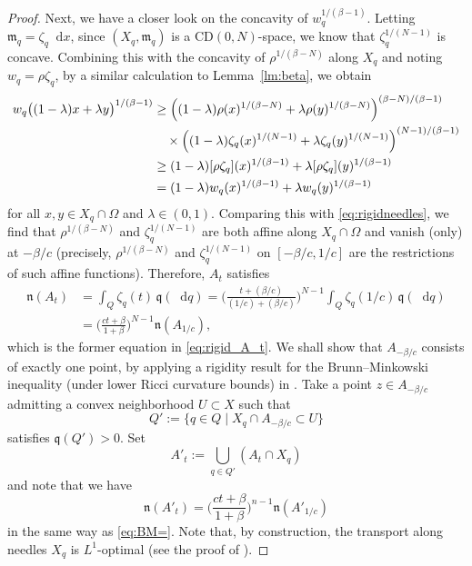 \documentclass[sts]{imsart}
\theoremstyle{definition}
\theoremstyle{remark}
\newcommand{\fm}{\mathfrak{m}}
\newcommand{\fn}{\mathfrak{n}}
\newcommand{\fq}{\mathfrak{q}}
\newcommand{\CD}{\mathrm{CD}}
\newcommand*\diff{\mathop{}\!\mathrm{d}}
\begin{document}
\begin{proof}
Next, we have a closer look on the concavity of $w_q^{1/(\beta-1)}$.
Letting $\fm_q =\zeta_q \diff x$, since $(X_q,\fm_q)$ is a $\CD(0,N)$-space, we know that $\zeta_q^{1/(N-1)}$ is concave.
Combining this with the concavity of $\rho^{1/(\beta -N)}$ along $X_q$ and noting $w_q=\rho \zeta_q$, by a similar calculation to Lemma~\ref{lm:beta}, we obtain
\begin{align*}
w_q \bigl( (1-\lambda)x +\lambda y \bigr)^{1/(\beta -1)}
&\ge \Bigl( (1-\lambda)\rho(x)^{1/(\beta -N)}
 +\lambda \rho(y)^{1/(\beta -N)} \Bigr)^{(\beta -N)/(\beta -1)} \\
&\quad \times \Bigl( (1-\lambda)\zeta_q(x)^{1/(N-1)}
 +\lambda \zeta_q(y)^{1/(N-1)} \Bigr)^{(N-1)/(\beta -1)} \\
&\ge (1-\lambda)[\rho\zeta_q](x)^{1/(\beta -1)}
 +\lambda [\rho\zeta_q](y)^{1/(\beta -1)} \\
&= (1-\lambda) w_q(x)^{1/(\beta -1)} +\lambda w_q(y)^{1/(\beta -1)}
\end{align*}
for all $x,y \in X_q \cap \Omega$ and $\lambda \in (0,1)$.
Comparing this with \eqref{eq:rigidneedles},
we find that $\rho^{1/(\beta -N)}$ and $\zeta_q^{1/(N-1)}$ are both affine along $X_q \cap \Omega$ and vanish (only) at $-\beta/c$
(precisely, $\rho^{1/(\beta -N)}$ and $\zeta_q^{1/(N-1)}$ on $[-\beta/c,1/c]$ are the restrictions of such affine functions).
Therefore, $A_t$ satisfies
\begin{equation*}%
\begin{split}
\fn(A_t) &= \int_Q \zeta_q(t) \,\fq(\diff q)
 =\biggl( \frac{t+(\beta/c)}{(1/c)+(\beta/c)} \biggr)^{N-1}
 \int_Q \zeta_q(1/c) \,\fq(\diff q) \\
&= \biggl( \frac{ct+\beta}{1+\beta} \biggr)^{N-1} \fn(A_{1/c}),
\end{split}
\end{equation*}
which is the former equation in \eqref{eq:rigid_A_t}.
%
We shall show that $A_{-\beta/c}$ consists of exactly one point,
by applying a rigidity result for the Brunn--Minkowski inequality (under lower Ricci curvature bounds) in \cite{BK}.
Take a point $z \in A_{-\beta/c}$ admitting a convex neighborhood $U \subset X$ such that
\[
Q' :=\{ q \in Q \mid X_q \cap A_{-\beta/c} \subset U \}
\]
satisfies $\fq(Q')>0$.
Set
\[
A'_t := \bigcup_{q \in Q'} (A_t \cap X_q)
\]
and note that we have
\[
\fn(A'_t) =\biggl( \frac{ct+\beta}{1+\beta} \biggr)^{n-1} \fn(A'_{1/c})
\]
in the same way as \eqref{eq:BM=}.
%
Note that, by construction, the transport along needles $X_q$ is $L^1$-optimal (see the proof of \cite[Theorem~5.1]{CM}).

\end{proof}
\end{document}
